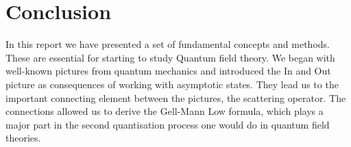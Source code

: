 \documentclass[12pt, titlepage]{article}
\begin{document}
\section{Conclusion}
In this report we have presented a set of fundamental concepts and methods. These are essential for starting to study Quantum field theory. We began with well-known pictures from quantum mechanics and introduced the In and Out picture as consequences of working with asymptotic states. They lead us to the important connecting element between the pictures, the scattering operator. The connections allowed us to derive the Gell-Mann Low formula, which plays a major part in the second quantisation process one would do in quantum field theories. 
\newpage
\begin{appendices}

\end{appendices}
\end{document}
